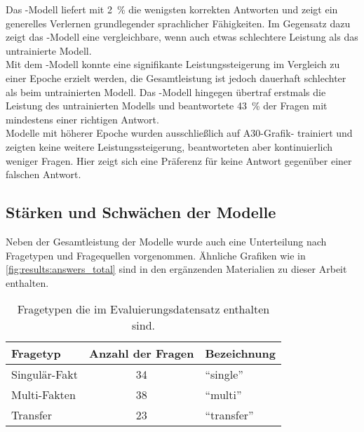 Das \liv-Modell liefert mit \SI{2}{\percent} die wenigsten korrekten Antworten und zeigt ein generelles Verlernen grundlegender sprachlicher Fähigkeiten.
Im Gegensatz dazu zeigt das \lia-Modell eine vergleichbare, wenn auch etwas schlechtere Leistung als das untrainierte Modell.\\

Mit dem \lev-Modell konnte eine signifikante Leistungssteigerung im Vergleich zu einer Epoche erzielt werden, die Gesamtleistung ist jedoch dauerhaft schlechter als beim untrainierten Modell.
Das \lea-Modell hingegen übertraf erstmals die Leistung des untrainierten Modells und beantwortete \SI{43}{\percent} der Fragen mit mindestens einer richtigen Antwort.\\

Modelle mit höherer Epoche wurden ausschließlich auf A30-Grafik- trainiert und zeigten keine weitere Leistungssteigerung, beantworteten aber kontinuierlich weniger Fragen.
Hier zeigt sich eine Präferenz für keine Antwort gegenüber einer falschen Antwort.\\

\subsection{Stärken und Schwächen der Modelle}\label{subsec:results:correctness:strengths}
Neben der Gesamtleistung der Modelle wurde auch eine Unterteilung nach Fragetypen und Fragequellen vorgenommen.
Ähnliche Grafiken wie in \cref{fig:results:answers_total} sind in den ergänzenden Materialien zu dieser Arbeit enthalten.

\begin{table}
    \centering
    \begin{tabular}{lcl}
        \toprule
        \textbf{Fragetyp} & \textbf{Anzahl der Fragen} & \textbf{Bezeichnung} \\
        \midrule
        Singulär-Fakt     & 34                         & \enquote{single}     \\
        Multi-Fakten      & 38                         & \enquote{multi}      \\
        Transfer          & 23                         & \enquote{transfer}   \\
        \bottomrule
    \end{tabular}
    \caption{Fragetypen die im Evaluierungsdatensatz enthalten sind.}\label{tab:eval-question-types}
\end{table}


